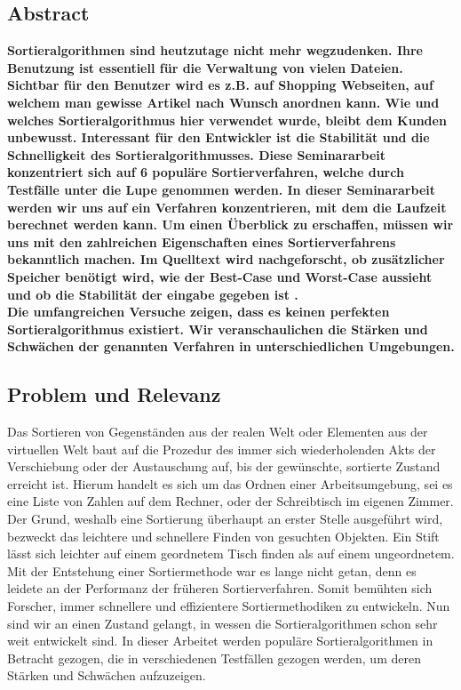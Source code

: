 \documentclass{article}
\begin{document}
\subsection{Abstract}
\textbf{Sortieralgorithmen sind heutzutage nicht mehr wegzudenken. Ihre Benutzung ist essentiell für die Verwaltung von vielen Dateien. Sichtbar für den Benutzer wird es z.B. auf Shopping Webseiten, auf welchem man gewisse Artikel nach Wunsch anordnen kann. Wie und welches Sortieralgorithmus hier verwendet wurde, bleibt dem Kunden unbewusst. Interessant für den Entwickler ist die Stabilität und die Schnelligkeit des Sortieralgorithmusses. Diese Seminararbeit konzentriert sich auf 6 populäre Sortierverfahren, welche durch Testfälle unter die Lupe genommen werden. In dieser Seminararbeit werden wir uns auf ein Verfahren konzentrieren, mit dem die Laufzeit berechnet werden kann. Um einen Überblick zu erschaffen, müssen wir uns mit den zahlreichen Eigenschaften eines Sortierverfahrens bekanntlich machen. Im Quelltext wird nachgeforscht, ob zusätzlicher Speicher benötigt wird, wie der Best-Case und Worst-Case aussieht und ob die Stabilität der eingabe gegeben ist .\\
Die umfangreichen Versuche zeigen, dass es keinen perfekten Sortieralgorithmus existiert. Wir veranschaulichen die Stärken und Schwächen der genannten Verfahren in unterschiedlichen Umgebungen.}
\subsection{Problem und Relevanz}
Das Sortieren von Gegenständen aus der realen Welt oder Elementen aus der virtuellen Welt baut auf die Prozedur des immer sich wiederholenden Akts der Verschiebung oder der Austauschung auf, bis der gewünschte, sortierte Zustand erreicht ist. Hierum handelt es sich um das Ordnen einer Arbeitsumgebung, sei es eine Liste von Zahlen auf dem Rechner, oder der Schreibtisch im eigenen Zimmer. Der Grund, weshalb eine Sortierung überhaupt an erster Stelle ausgeführt wird, bezweckt das leichtere und schnellere Finden von gesuchten Objekten. Ein Stift lässt sich leichter auf einem geordnetem Tisch finden als auf einem ungeordnetem. Mit der Entstehung einer Sortiermethode war es lange nicht getan, denn es leidete an der Performanz der früheren Sortierverfahren. Somit bemühten sich Forscher, immer schnellere und effizientere Sortiermethodiken zu entwickeln. Nun sind wir an einen Zustand gelangt, in wessen die Sortieralgorithmen schon sehr weit entwickelt sind. In dieser Arbeitet werden populäre Sortieralgorithmen in Betracht gezogen, die in verschiedenen Testfällen gezogen werden, um deren Stärken und Schwächen aufzuzeigen. 
\end{document}
